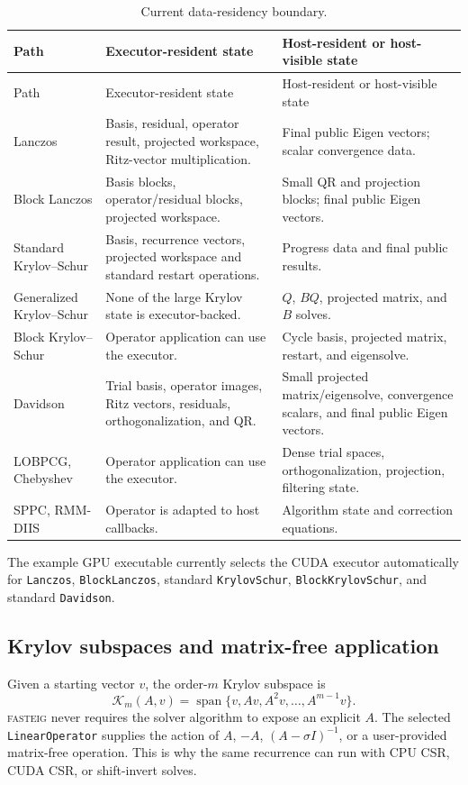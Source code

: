 \documentclass[11pt]{article}
\newcommand{\fasteig}{\textsc{fasteig}}
\newcommand{\code}[1]{\texttt{#1}}
\newcommand{\Kspace}[2]{\mathcal{K}_{#1}\!\left(#2\right)}
\begin{document}
\small
\begin{longtable}{P{0.22\textwidth} P{0.31\textwidth} P{0.37\textwidth}}
\caption{Current data-residency boundary.}
\label{tab:residency}\\
\toprule
Path & Executor-resident state & Host-resident or host-visible state \\
\midrule
\endfirsthead
\toprule
Path & Executor-resident state & Host-resident or host-visible state \\
\midrule
\endhead
Lanczos & Basis, residual, operator result, projected workspace, Ritz-vector multiplication. & Final public Eigen vectors; scalar convergence data. \\
Block Lanczos & Basis blocks, operator/residual blocks, projected workspace. & Small QR and projection blocks; final public Eigen vectors. \\
Standard Krylov--Schur & Basis, recurrence vectors, projected workspace and standard restart operations. & Progress data and final public results. \\
Generalized Krylov--Schur & None of the large Krylov state is executor-backed. & $Q$, $BQ$, projected matrix, and $B$ solves. \\
Block Krylov--Schur & Operator application can use the executor. & Cycle basis, projected matrix, restart, and eigensolve. \\
Davidson & Trial basis, operator images, Ritz vectors, residuals, orthogonalization, and QR. & Small projected matrix/eigensolve, convergence scalars, and final public Eigen vectors. \\
LOBPCG, Chebyshev & Operator application can use the executor. & Dense trial spaces, orthogonalization, projection, filtering state. \\
SPPC, RMM-DIIS & Operator is adapted to host callbacks. & Algorithm state and correction equations. \\
\bottomrule
\end{longtable}
\normalsize

The example GPU executable currently selects the CUDA executor automatically
for \code{Lanczos}, \code{BlockLanczos}, standard \code{KrylovSchur},
\code{BlockKrylovSchur}, and standard \code{Davidson}.

\subsection{Krylov subspaces and matrix-free application}

Given a starting vector $v$, the order-$m$ Krylov subspace is
\begin{equation}
  \Kspace{m}{A,v}=\operatorname{span}\{v,Av,A^2v,\ldots,A^{m-1}v\}.
\end{equation}
\fasteig{} never requires the solver algorithm to expose an explicit $A$.
The selected \code{LinearOperator} supplies the action of $A$, $-A$,
$(A-\sigma I)^{-1}$, or a user-provided matrix-free operation.  This is why the
same recurrence can run with CPU CSR, CUDA CSR, or shift-invert solves.
\end{document}
